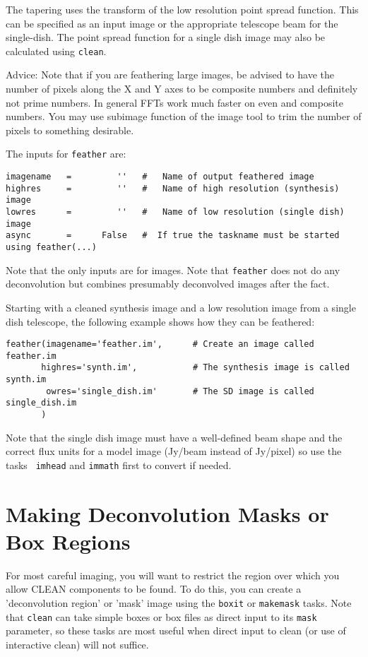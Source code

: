 The tapering uses the transform of the low resolution point spread
function. This can be specified as an input image or the appropriate
telescope beam for the single-dish.  The point spread function for a
single dish image may also be calculated using {\tt clean}.

Advice: Note that if you are feathering large images, be advised to
have the number of pixels along the X and Y axes to be composite
numbers and definitely not prime numbers. In general FFTs work much
faster on even and composite numbers. You may use subimage function of
the image tool to trim the number of pixels to something desirable.

The inputs for {\tt feather} are:
\small
\begin{verbatim}
imagename   =         ''   #   Name of output feathered image
highres     =         ''   #   Name of high resolution (synthesis) image
lowres      =         ''   #   Name of low resolution (single dish) image
async       =      False   #  If true the taskname must be started using feather(...)
\end{verbatim}
\normalsize
Note that the only inputs are for images.
Note that {\tt feather} does not do any deconvolution but combines presumably
deconvolved images after the fact.

Starting with a cleaned synthesis image and a low resolution image
from a single dish telescope, the following example shows how they
can be feathered:
\small
\begin{verbatim}
feather(imagename='feather.im',      # Create an image called feather.im
       highres='synth.im',           # The synthesis image is called synth.im
        owres='single_dish.im'       # The SD image is called single_dish.im
       )
\end{verbatim}
\normalsize

Note that the single dish image must have a
well-defined beam shape and the correct flux units for a model image
(Jy/beam instead of Jy/pixel) so use the tasks {\tt
imhead} and {\tt immath} first to convert if needed.

\section{Making Deconvolution Masks or Box Regions}
\label{section:im.mask}

For most careful imaging, you will want to restrict the region over
which you allow CLEAN components to be found.  To do this, you can
create a 'deconvolution region' or 'mask' image using the {\tt boxit}
or {\tt makemask} tasks.  Note that {\tt clean} can take simple boxes
or box files as direct input to its {\tt mask} parameter, so these
tasks are most useful when direct input to clean (or use of
interactive clean) will not suffice.


